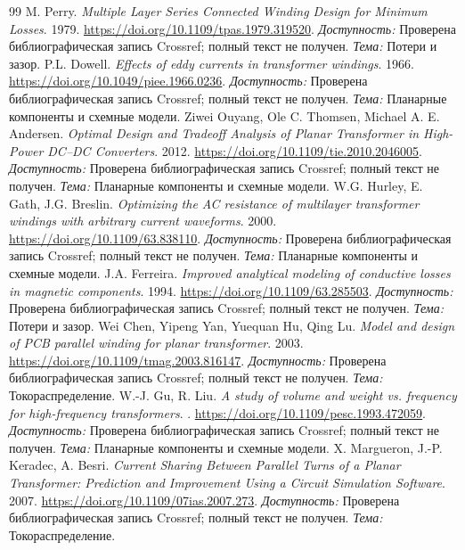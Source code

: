 \documentclass[14pt,a4paper]{extarticle}
\begin{document}
\begin{thebibliography}{99}
M. Perry. \textit{Multiple Layer Series Connected Winding Design for Minimum Losses}. 1979.
\url{https://doi.org/10.1109/tpas.1979.319520}.
\textit{Доступность:} Проверена библиографическая запись Crossref; полный текст не получен. \textit{Тема:} Потери и зазор.
P.L. Dowell. \textit{Effects of eddy currents in transformer windings}. 1966.
\url{https://doi.org/10.1049/piee.1966.0236}.
\textit{Доступность:} Проверена библиографическая запись Crossref; полный текст не получен. \textit{Тема:} Планарные компоненты и схемные модели.
Ziwei Ouyang, Ole C. Thomsen, Michael A. E. Andersen. \textit{Optimal Design and Tradeoff Analysis of Planar Transformer in High-Power DC–DC Converters}. 2012.
\url{https://doi.org/10.1109/tie.2010.2046005}.
\textit{Доступность:} Проверена библиографическая запись Crossref; полный текст не получен. \textit{Тема:} Планарные компоненты и схемные модели.
W.G. Hurley, E. Gath, J.G. Breslin. \textit{Optimizing the AC resistance of multilayer transformer windings with arbitrary current waveforms}. 2000.
\url{https://doi.org/10.1109/63.838110}.
\textit{Доступность:} Проверена библиографическая запись Crossref; полный текст не получен. \textit{Тема:} Планарные компоненты и схемные модели.
J.A. Ferreira. \textit{Improved analytical modeling of conductive losses in magnetic components}. 1994.
\url{https://doi.org/10.1109/63.285503}.
\textit{Доступность:} Проверена библиографическая запись Crossref; полный текст не получен. \textit{Тема:} Потери и зазор.
Wei Chen, Yipeng Yan, Yuequan Hu, Qing Lu. \textit{Model and design of PCB parallel winding for planar transformer}. 2003.
\url{https://doi.org/10.1109/tmag.2003.816147}.
\textit{Доступность:} Проверена библиографическая запись Crossref; полный текст не получен. \textit{Тема:} Токораспределение.
W.-J. Gu, R. Liu. \textit{A study of volume and weight vs. frequency for high-frequency transformers}. .
\url{https://doi.org/10.1109/pesc.1993.472059}.
\textit{Доступность:} Проверена библиографическая запись Crossref; полный текст не получен. \textit{Тема:} Планарные компоненты и схемные модели.
X. Margueron, J.-P. Keradec, A. Besri. \textit{Current Sharing Between Parallel Turns of a Planar Transformer: Prediction and Improvement Using a Circuit Simulation Software}. 2007.
\url{https://doi.org/10.1109/07ias.2007.273}.
\textit{Доступность:} Проверена библиографическая запись Crossref; полный текст не получен. \textit{Тема:} Токораспределение.

\end{thebibliography}
\end{document}
